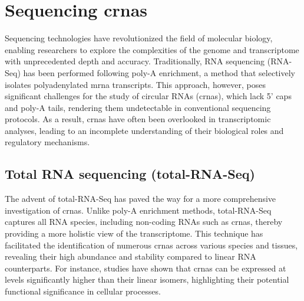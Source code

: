 \section{Sequencing \glspl{crna}}

Sequencing technologies have revolutionized the field of molecular biology,
enabling researchers to explore the complexities of the genome and
transcriptome with unprecedented depth and accuracy.
Traditionally, RNA sequencing (RNA-Seq) has been performed following poly-A
enrichment, a method that selectively isolates polyadenylated \gls{mrna} transcripts.
This approach, however, poses significant challenges for the study of circular
RNAs (\glspl{crna}), which lack 5' caps and poly-A tails, rendering them
undetectable in conventional sequencing protocols\supercite{guo_expanded_2014}.
As a result, \glspl{crna} have often been overlooked in transcriptomic analyses,
leading to an incomplete understanding of their biological roles and regulatory
mechanisms.

\subsection{Total RNA sequencing (total-RNA-Seq)}
The advent of total-RNA-Seq has paved the way for a more comprehensive
investigation of \glspl{crna}.
Unlike poly-A enrichment methods, total-RNA-Seq captures all RNA species,
including non-coding RNAs such as \glspl{crna}, thereby providing a more
holistic view of the transcriptome\supercite{panda_identification_2017}.
This technique has facilitated the identification of numerous \glspl{crna}
across various species and tissues, revealing their high abundance and
stability compared to linear RNA
counterparts\supercite{liu_circular_2016,cao_expression_2018}.
For instance, studies have shown that \glspl{crna} can be expressed at levels
significantly higher than their linear isomers, highlighting their potential
functional significance in cellular processes\supercite{liu_circular_2016}.
